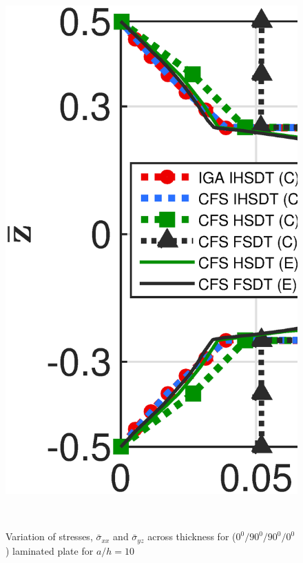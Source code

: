 \documentclass[3p,preprint,12pt]{elsarticle}
\begin{document}
\begin{figure}
\begin{minipage}[c]{\textwidth}
	\end{minipage}
	\begin{minipage}{\textwidth}
		\graphicspath{{./All_Images/}}
		\centering
		\includegraphics[scale=0.33]{4Layer_Sigma_yz_IGA_NPSDT_Bending_h_By_a_1_10.eps}
	\end{minipage}
	\\
	\caption{Variation of stresses, $\bar{\sigma}_{xx}$ and $\bar{\sigma}_{yz}$  across thickness for ($0^0/90^0/90^0/0^0$) laminated plate for $a/h=10$}
	\label{fig:Static_4layer}
\end{figure}
\end{document}
